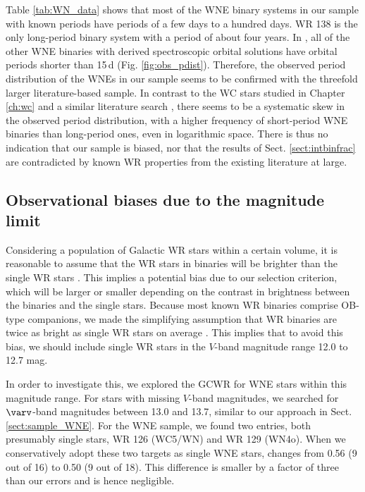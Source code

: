 Table \ref{tab:WN_data} shows that most of
the WNE binary systems in our sample with known periods have periods of a few days to a hundred days. WR 138 is the only long-period binary system with a period of about four years. In , all of the other WNE binaries with derived spectroscopic orbital solutions have orbital periods shorter than 15\,d (Fig. \ref{fig:obs_pdist}). Therefore, the observed period distribution of the WNEs in our sample seems to be confirmed with the threefold larger literature-based sample. In contrast to the WC stars studied in Chapter \ref{ch:wc} and a similar literature search , there seems to be a systematic skew in the observed period distribution, with a higher frequency of short-period WNE binaries than long-period ones, even in logarithmic space. There is thus no indication that our sample is biased, nor that the results of Sect. \ref{sect:intbinfrac} are contradicted by known WR properties from the existing literature at large.  

\subsection{Observational biases due to the magnitude limit} \label{sect:obsbias_brightness}

Considering a population of Galactic WR stars within a certain volume, it is reasonable to assume that the WR stars in binaries will be brighter than the single WR stars \citep{1980VanbeverenConti}. This implies a potential bias due to our selection criterion, which will be larger or smaller depending on the contrast in brightness between the binaries and the single stars.
Because most known WR binaries comprise OB-type companions, we made the simplifying assumption that WR binaries are twice as bright as single WR stars on average \citep[e.g.][]{2019Shenar}. This implies that to avoid this bias, we should include single WR stars in the $V$-band magnitude range 12.0 to 12.7 mag.

In order to investigate this, we explored the GCWR for WNE stars within this magnitude range. For stars with missing $V$-band magnitudes, we searched for $\varv$-band magnitudes between 13.0 and 13.7, similar to our approach in Sect. \ref{sect:sample_WNE}. For the WNE sample, we found two entries, both presumably single stars, WR 126 (WC5/WN) and WR 129 (WN4o). When we conservatively adopt these two targets as single WNE stars, \fintWNE{} changes from 0.56 (9 out of 16) to 0.50 (9 out of 18). This difference is smaller by a factor of three than our errors and is hence negligible.

